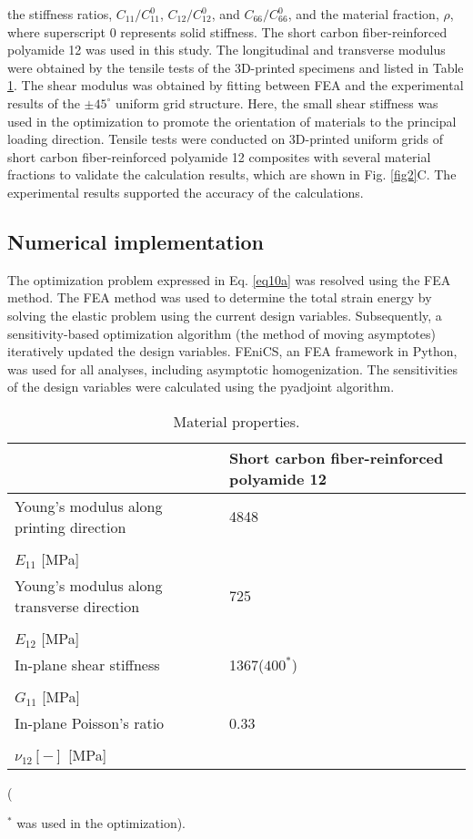 \documentclass[a4paper,7pt,fleqn]{article}   %
\begin{document}
\begin{multicols}{2}
		the stiffness ratios, $C_{11}/C_{11}^{0}$, $C_{12}/C_{12}^{0}$, and $C_{66}/C_{66}^{0}$, and the material
		fraction, $\rho$, where superscript 0 represents solid stiffness. The short
		carbon fiber-reinforced polyamide 12 was used in this study. The
		longitudinal and transverse modulus were obtained by the tensile tests
		of the 3D-printed specimens and listed in Table \ref{tab1}. The shear modulus
		was obtained by fitting between FEA and the experimental results of the
		$\pm45^{\circ}$ uniform grid structure. Here, the small shear stiffness was used in
		the optimization to promote the orientation of materials to the principal
		loading direction. Tensile tests were conducted on 3D-printed uniform
		grids of short carbon fiber-reinforced polyamide 12 composites with
		several material fractions to validate the calculation results, which are
		shown in Fig. \ref{fig2}C. The experimental results supported the accuracy of the
		calculations.
		
		\subsection{Numerical implementation}
		The optimization problem expressed in Eq. \eqref{eq10a} was resolved using
		the FEA method. The FEA method was used to determine the total strain
		energy by solving the elastic problem using the current design variables.
		Subsequently, a sensitivity-based optimization algorithm (the method of
		moving asymptotes) iteratively updated the design variables. FEniCS, an
		FEA framework in Python, was used for all analyses, including asymptotic
		homogenization. The sensitivities of the design variables were
		calculated using the pyadjoint algorithm.
		\begin{table}[H]
			\caption{Material properties.}
			\small
			\begin{tabular*}{90mm}{p{40mm}p{40mm}}
				\hline
				&Short carbon fiber-reinforced polyamide 12\\
				\hline
				Young's modulus along printing direction & 4848\\
				& \\
				$E_{11}$ [MPa] & \\
				\hline
				Young's modulus along transverse direction & 725\\
				& \\
				$E_{12}$ [MPa] & \\
				\hline
				In-plane shear stiffness & 1367($400^{*}$)\\
				& \\
				$G_{11}$ [MPa] & \\
				\hline
				In-plane Poisson's ratio & 0.33\\
				& \\
				$\nu_{12}[-]$ [MPa] & \\
				\hline
			\end{tabular*}
			(\raggedright $^{*}$ was used in the optimization).
			\label{tab1}
		\end{table}
		

\end{multicols}
\end{document}
